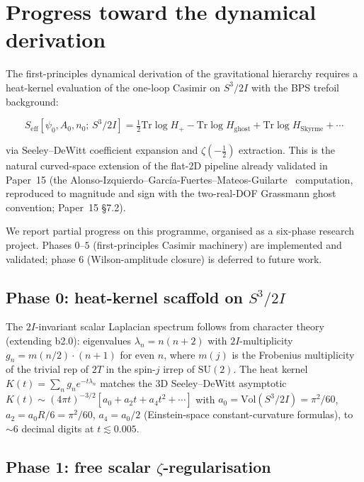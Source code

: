 \documentclass[11pt]{article}
\newcommand{\half}{\tfrac{1}{2}}
\begin{document}
\section{Progress toward the dynamical derivation}
\label{sec:open}

The first-principles dynamical derivation of the gravitational
hierarchy requires a heat-kernel evaluation of the one-loop Casimir
on $S^3/2I$ with the BPS trefoil background:

\begin{equation}
  S_\text{eff}[\psi_0, A_0, n_0;\, S^3/2I]
   = \tfrac{1}{2} \mathrm{Tr} \log H_+
   - \mathrm{Tr} \log H_\text{ghost}
   + \mathrm{Tr} \log H_\text{Skyrme} + \cdots
\end{equation}

via Seeley--DeWitt coefficient expansion and $\zeta(-\half)$
extraction.  This is the natural curved-space extension of the
flat-2D pipeline already validated in Paper~15 (the
Alonso-Izquierdo--Garc\'ia-Fuertes--Mateos-Guilarte~\cite{AlonsoIzquierdo2016}
computation, reproduced to magnitude and sign with the
two-real-DOF Grassmann ghost convention; Paper~15 \S7.2).

We report partial progress on this programme, organised as a
six-phase research project.  Phases $0$--$5$ (first-principles
Casimir machinery) are implemented and validated; phase $6$
(Wilson-amplitude closure) is deferred to future work.

\subsection{Phase 0: heat-kernel scaffold on $S^3/2I$}

The $2I$-invariant scalar Laplacian spectrum follows from character
theory (extending b2.0):  eigenvalues $\lambda_n = n(n+2)$ with
$2I$-multiplicity $g_n = m(n/2) \cdot (n{+}1)$ for even $n$, where
$m(j)$ is the Frobenius multiplicity of the trivial rep of $2T$ in
the spin-$j$ irrep of $\mathrm{SU}(2)$.  The heat kernel
$K(t) = \sum_n g_n e^{-t \lambda_n}$ matches the 3D Seeley--DeWitt
asymptotic
$K(t) \sim (4\pi t)^{-3/2} [a_0 + a_2 t + a_4 t^2 + \cdots]$
with $a_0 = \mathrm{Vol}(S^3/2I) = \pi^2/60$,
$a_2 = a_0 R / 6 = \pi^2 / 60$,
$a_4 = a_0 / 2$  (Einstein-space constant-curvature formulas),
to $\sim 6$ decimal digits at $t \lesssim 0.005$.

\subsection{Phase 1: free scalar $\zeta$-regularisation}
\end{document}
